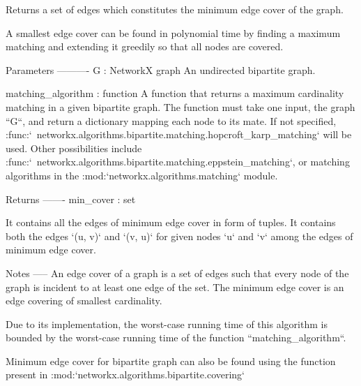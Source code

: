 \begin{DoxyVerb}Returns a set of edges which constitutes
the minimum edge cover of the graph.

A smallest edge cover can be found in polynomial time by finding
a maximum matching and extending it greedily so that all nodes
are covered.

Parameters
----------
G : NetworkX graph
    An undirected bipartite graph.

matching_algorithm : function
    A function that returns a maximum cardinality matching in a
    given bipartite graph. The function must take one input, the
    graph ``G``, and return a dictionary mapping each node to its
    mate. If not specified,
    :func:`~networkx.algorithms.bipartite.matching.hopcroft_karp_matching`
    will be used. Other possibilities include
    :func:`~networkx.algorithms.bipartite.matching.eppstein_matching`,
    or matching algorithms in the
    :mod:`networkx.algorithms.matching` module.

Returns
-------
min_cover : set

    It contains all the edges of minimum edge cover
    in form of tuples. It contains both the edges `(u, v)` and `(v, u)`
    for given nodes `u` and `v` among the edges of minimum edge cover.

Notes
-----
An edge cover of a graph is a set of edges such that every node of
the graph is incident to at least one edge of the set.
The minimum edge cover is an edge covering of smallest cardinality.

Due to its implementation, the worst-case running time of this algorithm
is bounded by the worst-case running time of the function
``matching_algorithm``.

Minimum edge cover for bipartite graph can also be found using the
function present in :mod:`networkx.algorithms.bipartite.covering`
\end{DoxyVerb}
 